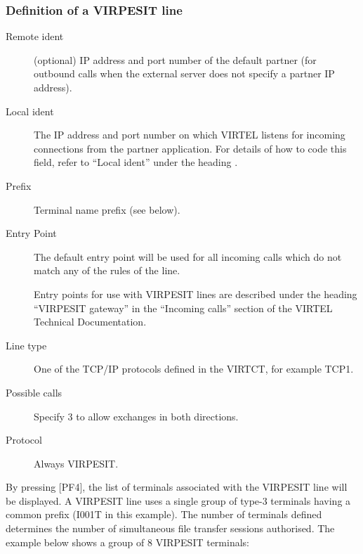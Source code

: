 \documentclass[letterpaper,10pt,english]{sphinxmanual}
\begin{document}
\subsubsection{Definition of a VIRPESIT line}
\label{\detokenize{connectivity_guide:definition-of-a-virpesit-line}}\begin{description}
\item[{Remote ident}] \leavevmode
(optional) IP address and port number of the default partner (for
outbound calls when the external server does not specify a partner
IP address).

\item[{Local ident}] \leavevmode
The IP address and port number on which VIRTEL listens for incoming connections from the partner application. For details of how to code this field, refer to “Local ident” under the heading {\hyperref[\detokenize{connectivity_guide:bookmark13}]{}}.

\item[{Prefix}] \leavevmode
Terminal name prefix (see below).

\item[{Entry Point}] \leavevmode
The default entry point will be used for all incoming calls which do not match any of the rules of the line.

Entry points for use with VIRPESIT lines are described under the heading “VIRPESIT gateway” in the “Incoming calls” section of the VIRTEL Technical Documentation.

\item[{Line type}] \leavevmode
One of the TCP/IP protocols defined in the VIRTCT, for example TCP1.

\item[{Possible calls}] \leavevmode
Specify 3 to allow exchanges in both directions.

\item[{Protocol}] \leavevmode
Always VIRPESIT.

\end{description}

By pressing {[}PF4{]}, the list of terminals associated with the VIRPESIT line will be displayed. A VIRPESIT line uses a single group of type-3 terminals having a common prefix (I001T in this example). The number of terminals defined determines the number of simultaneous file transfer sessions authorised. The example below shows a group of 8 VIRPESIT terminals:

\end{document}
